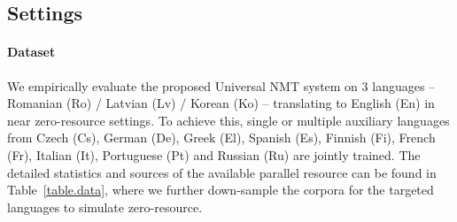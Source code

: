 \subsection{Settings}

\paragraph{Dataset} We empirically evaluate the proposed Universal NMT system on $3$ languages -- Romanian (Ro) / Latvian (Lv) / Korean (Ko)  -- translating to English (En) in near zero-resource settings. To achieve this, single or multiple auxiliary languages from Czech (Cs), German (De), Greek (El), Spanish (Es), Finnish (Fi), French (Fr),  Italian (It), Portuguese (Pt) and Russian (Ru) are jointly trained. The detailed statistics and sources of the available parallel resource can be found in Table~\ref{table.data}, where we further down-sample the corpora for the targeted languages to simulate zero-resource. 

